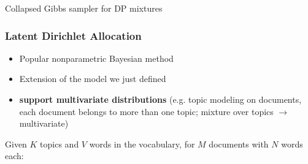 \begin{algorithm}[H]  
	\caption{Collapsed Gibbs sampler for DP mixtures}
\end{algorithm}

\subsubsection{Latent Dirichlet Allocation}
\begin{itemize}
	\item Popular nonparametric Bayesian method
	\item Extension of the model we just defined
	\item \textbf{support multivariate distributions} (e.g. topic modeling on documents, each document belongs to more than one topic; mixture over topics $\to$ multivariate)
\end{itemize}

Given $K$ topics and $V$ words in the vocabulary, for $M$ documents with $N$ words each:\\

